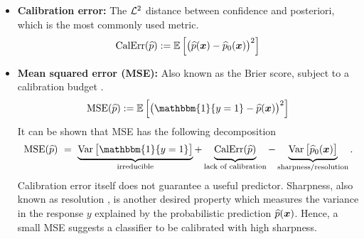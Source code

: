 \begin{itemize}
    \item \textbf{Calibration error:} The $\mathcal{L}^2$ distance between confidence and posteriori, which is the most commonly used metric.
    \begin{equation*}
    \mathrm{CalErr}(\widehat p) :=  \mathbb{E}\left[ \bigl( \widehat p(\text{\boldmath $x$}) - \widehat p_0(\text{\boldmath $x$}) \bigr)^2 \right]
    \end{equation*}

    \item \textbf{Mean squared error (MSE):} Also known as the Brier score, subject to a calibration budget \cite{brier1950verification, gneiting2007probabilistic}.
    \begin{equation*}
        \mathrm{MSE}(\hat p)  := \E\left[ \bigl( \mathbbm{1}\{ y = 1 \} - \hat p(\xx) \bigr)^2 \right]
    \end{equation*}
    It can be shown that MSE has the following decomposition
    \begin{equation*}
        \mathrm{MSE}(\hat p) 
        \ = \ \underbrace{ \var\, \bigl[\mathbbm{1}\{ y = 1 \} \bigr] }_{\text{irreducible}}  
        + 
        \underbrace{ \vphantom{\bigl[} \mathrm{CalErr}(\hat p) }_{\text{lack of calibration}}
        - 
        \underbrace{\var\, \bigl[ \hat p_0(\xx) \bigr]}_{\text{sharpness/resolution}}
        .
    \end{equation*}
    Calibration error itself does not guarantee a useful predictor. Sharpness, also known as resolution \cite{murphy1973new, kuleshov2015calibrated}, is another desired property which measures the variance in the response $y$ explained by the probabilistic prediction $\widehat p(\text{\boldmath $x$})$. Hence, a small MSE suggests a classifier to be calibrated with high sharpness. 
    

\end{itemize}
